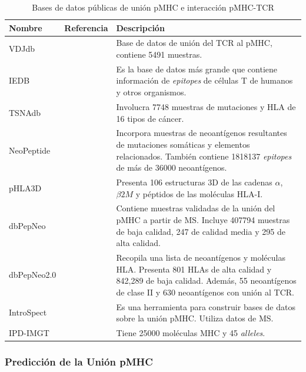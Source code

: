 \begin{table}[h]
	\caption{Bases de datos públicas de unión pMHC e interacción pMHC-TCR}
	\label{tab:bd}
	\small
	\setlength{\tabcolsep}{0.5em} %
	{\renewcommand{\arraystretch}{1.2}%
		
		\begin{tabular}{lp{3.5cm}p{8.1cm}}
			\textbf{Nombre} &  \textbf{Referencia} & \textbf{Descripción} \\ \midrule
			VDJdb           &  \cite{shugay2018vdjdb, bagaev2020vdjdb} & Base de datos de unión del TCR al pMHC, contiene 5491 muestras. \\
			IEDB            &  \cite{vita2019immune} & Es la base de datos más grande que contiene información de \textit{epitopes} de células T de humanos y otros organismos. \\
			TSNAdb          &  \cite{wu2018tsnadb} & Involucra 7748 muestras de mutaciones y HLA de 16 tipos de cáncer. \\
			NeoPeptide      &  \cite{zhou2019neopeptide} & Incorpora muestras de neoantígenos resultantes de mutaciones somáticas y elementos relacionados. También contiene 1818137 \textit{epitopes} de más de 36000 neoantígenos. \\
			
			pHLA3D          &  \cite{e2019phla3d} & Presenta 106 estructuras 3D de las cadenas $\alpha$, $\beta 2M$ y péptidos de las moléculas HLA-I. \\
			dbPepNeo        &  \cite{tan2020dbpepneo} & Contiene muestras validadas de la unión del pMHC a partir de MS. Incluye 407794 muestras de baja calidad, 247 de calidad media y 295 de alta calidad. \\
			dbPepNeo2.0     &  \cite{lu2022dbpepneo2} & Recopila una lista de neoantígenos y moléculas HLA. Presenta 801 HLAs de alta calidad y 842,289 de baja calidad. Además, 55 neoantígenos de clase II y 630 neoantígenos con unión al TCR. \\
			IntroSpect      &  \cite{zhang2022introspect} & Es una herramienta para construir bases de datos sobre la unión pMHC. Utiliza datos de MS. \\
			IPD-IMGT    &  \cite{robinson2020ipd} & Tiene 25000 moléculas MHC y 45 \textit{alleles}. \\
		\end{tabular}
	}
\end{table}

\subsubsection{Predicción de la Unión pMHC}

